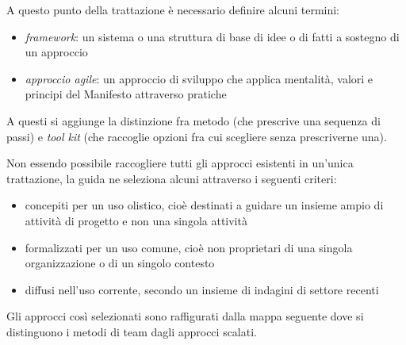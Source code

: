 A questo punto della trattazione \`e necessario definire alcuni termini:
\begin {itemize}
\item \emph{framework}: un sistema o una struttura di base di idee o
di fatti a sostegno di un approccio
\item  \emph{approccio agile}: un approccio di sviluppo che applica mentalit\`a,
valori e principi del Manifesto attraverso pratiche
\end{itemize}
A questi si aggiunge la distinzione fra
metodo (che prescrive una sequenza di passi) e \emph{tool kit} (che raccoglie
opzioni fra cui scegliere senza prescriverne una).

Non essendo possibile raccogliere tutti gli approcci esistenti in un'unica trattazione,
la guida ne seleziona alcuni attraverso i seguenti criteri:
\begin {itemize}
\item concepiti per un uso olistico, cio\`e destinati a guidare un insieme ampio
di attivit\`a di progetto e non una singola attivit\`a
\item formalizzati per un uso comune, cio\`e non proprietari di una singola
organizzazione o di un singolo contesto
\item diffusi nell'uso corrente, secondo un insieme di indagini di settore
recenti
\end {itemize}

Gli approcci cos\`i selezionati sono raffigurati dalla mappa seguente dove
si distinguono i metodi di team dagli approcci scalati.

